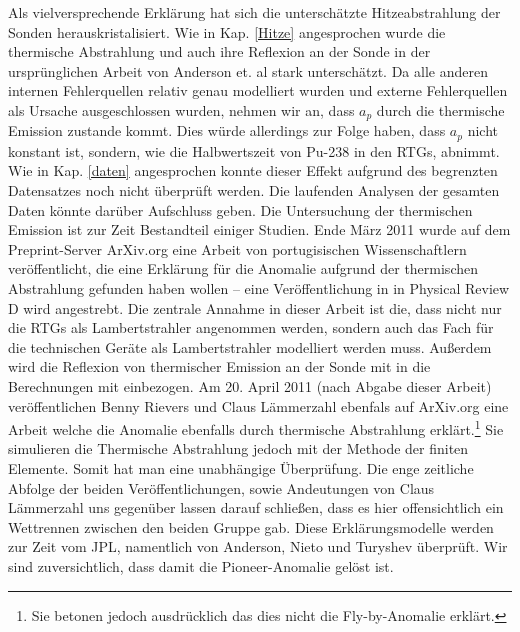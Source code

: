 \bigskip

Als vielversprechende Erklärung hat sich die unterschätzte Hitzeabstrahlung der Sonden herauskristalisiert. Wie in Kap. \ref{Hitze} angesprochen wurde die thermische Abstrahlung und auch ihre Reflexion an der Sonde in der ursprünglichen Arbeit von Anderson et. al \cite{Anderson2002} stark unterschätzt. Da alle anderen internen Fehlerquellen relativ genau modelliert wurden und externe Fehlerquellen als Ursache ausgeschlossen wurden, nehmen wir an, dass $a_p$ durch die thermische Emission zustande kommt. Dies würde allerdings zur Folge haben, dass $a_p$ nicht konstant ist, sondern, wie die Halbwertszeit von Pu-238 in den RTGs, abnimmt. Wie in Kap. \ref{daten} angesprochen konnte dieser Effekt aufgrund des begrenzten Datensatzes noch nicht überprüft werden. Die laufenden Analysen der gesamten Daten könnte darüber Aufschluss geben. Die Untersuchung der thermischen Emission ist zur Zeit Bestandteil einiger Studien. Ende März 2011 wurde auf dem Preprint-Server ArXiv.org eine Arbeit von portugisischen Wissenschaftlern veröffentlicht\cite{port2011}, die eine Erklärung für die Anomalie aufgrund der thermischen Abstrahlung gefunden haben wollen – eine Veröffentlichung in in Physical Review D wird angestrebt. Die zentrale Annahme in dieser Arbeit ist die, dass nicht nur die RTGs als Lambertstrahler angenommen werden, sondern auch das Fach für die technischen Geräte als Lambertstrahler modelliert werden muss. Außerdem wird die Reflexion von thermischer Emission an der Sonde mit in die Berechnungen mit einbezogen. Am 20. April 2011 (nach Abgabe dieser Arbeit) veröffentlichen Benny Rievers und Claus Lämmerzahl ebenfals auf ArXiv.org eine Arbeit welche die Anomalie ebenfalls durch thermische Abstrahlung erklärt.\cite{Rievers2011}\footnote{Sie betonen jedoch ausdrücklich das dies nicht die Fly-by-Anomalie erklärt.} Sie simulieren die Thermische Abstrahlung jedoch mit der Methode der finiten Elemente. Somit hat man eine unabhängige Überprüfung. Die enge zeitliche Abfolge der beiden Veröffentlichungen, sowie Andeutungen von Claus Lämmerzahl uns gegenüber lassen darauf schließen, dass es hier offensichtlich ein Wettrennen zwischen den beiden Gruppe gab.
Diese Erklärungsmodelle werden zur Zeit vom JPL, namentlich von Anderson, Nieto und Turyshev überprüft. Wir sind zuversichtlich, dass damit die Pioneer-Anomalie gelöst ist.
